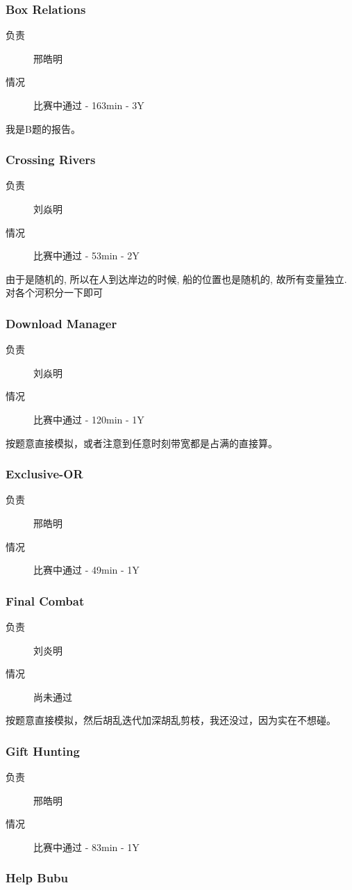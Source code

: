 \documentclass[a4paper, 11pt, nofonts, nocap, fancyhdr]{ctexart}
\newcommand{\problem}[1]{\subsubsection{#1}}
\begin{document}
\problem{Box Relations}

\begin{description}
\item[负责] 邢皓明
\item[情况] 比赛中通过 - 163min - 3Y
\end{description}

我是B题的报告。

\problem{Crossing Rivers}

\begin{description}
\item[负责] 刘焱明
\item[情况] 比赛中通过 - 53min - 2Y
\end{description}

由于是随机的, 所以在人到达岸边的时候, 船的位置也是随机的, 故所有变量独立. 对各个河积分一下即可

\problem{Download Manager}

\begin{description}
\item[负责] 刘焱明
\item[情况] 比赛中通过 - 120min - 1Y
\end{description}

按题意直接模拟，或者注意到任意时刻带宽都是占满的直接算。

\problem{Exclusive-OR}

\begin{description}
\item[负责] 邢皓明
\item[情况] 比赛中通过 - 49min - 1Y
\end{description}

\problem{Final Combat}

\begin{description}
\item[负责] 刘炎明
\item[情况] 尚未通过
\end{description}

按题意直接模拟，然后胡乱迭代加深胡乱剪枝，我还没过，因为实在不想碰。

\problem{Gift Hunting}

\begin{description}
\item[负责] 邢皓明
\item[情况] 比赛中通过 - 83min - 1Y
\end{description}


\problem{Help Bubu}
\end{document}
